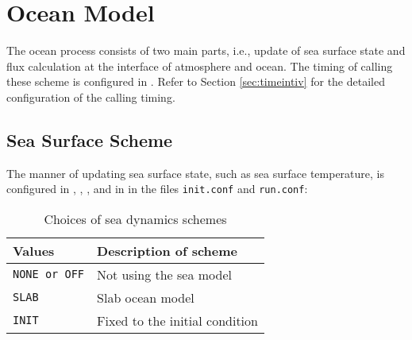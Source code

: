 \section{Ocean Model} \label{sec:basic_usel_ocean}
The ocean process consists of two main parts, i.e., update of sea surface state and flux calculation at the interface of atmosphere and ocean. The timing of calling these scheme is configured in . Refer to Section \ref{sec:timeintiv} for the detailed configuration of the calling timing.

\subsection{Sea Surface Scheme}
The manner of updating sea surface state, such as sea surface temperature, is configured in , , , and  in  in the files \verb|init.conf| and \verb|run.conf|:


\begin{table}[h]
\begin{center}
  \caption{Choices of sea dynamics schemes}
  \label{tab:nml_ocean_dyn}
  \begin{tabularx}{150mm}{lX} \hline
    \rowcolor[gray]{0.9}  Values & Description of scheme \\ \hline
      \verb|NONE or OFF| & Not using the sea model \\
      \verb|SLAB|        & Slab ocean model \\
      \verb|INIT|        & Fixed to the initial condition \\
    \hline
  \end{tabularx}
\end{center}
\end{table}

